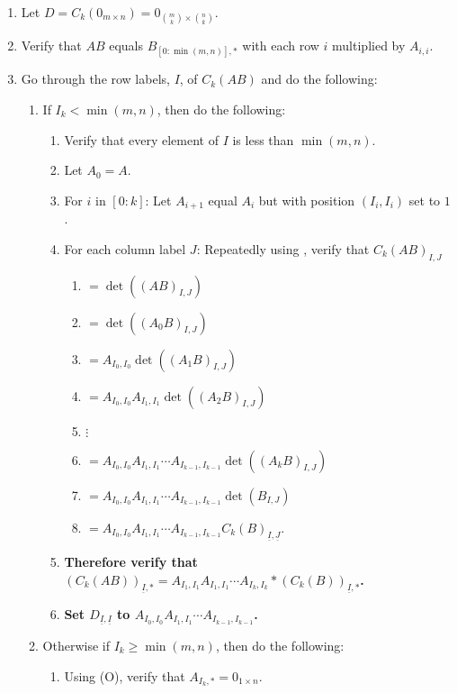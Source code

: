 \documentclass[twocolumn]{article}
\newcommand{\ul}[1]{\underline{#1}}
\newcommand{\procedurehr}[2][]{\hyperref[sec:procedure #2]{\ifthenelse{\equal{#1}{}}{procedure #2}{#1}}}
\begin{document}
				\begin{enumerate}
					\item Let $D=C_k(0_{m\times n})=0_{\binom{m}{k}\times\binom{n}{k}}$.
					\item Verify that $AB$ equals $B_{[0:\min(m,n)],*}$ with each row $i$ multiplied by $A_{i,i}$.
					\item Go through the row labels, $I$, of $C_k(AB)$ and do the following:
					\begin{enumerate}
						\item If $I_k<\min(m,n)$, then do the following:
						\begin{enumerate}
							\item Verify that every element of $I$ is less than $\min(m,n)$.
							\item Let $A_0=A$.
							\item For $i$ in $[0:k]$: Let $A_{i+1}$ equal $A_{i}$ but with position $(I_i,I_i)$ set to $1$.
							\item For each column label $J$: Repeatedly using \procedurehr{3.14}, verify that ${C_k(AB)}_{I,J}$
							\begin{enumerate}
								\item $=\det((AB)_{I,J})$
								\item $=\det((A_0B)_{I,J})$
								\item $=A_{I_0,I_0}\det((A_1B)_{I,J})$
								\item $=A_{I_0,I_0}A_{I_1,I_1}\det((A_2B)_{I,J})$
								\item $\vdots$
								\item $=A_{I_0,I_0}A_{I_1,I_1}\cdots A_{I_{k-1},I_{k-1}}\det((A_kB)_{I,J})$
								\item $=A_{I_0,I_0}A_{I_1,I_1}\cdots A_{I_{k-1},I_{k-1}}\det(B_{I,J})$
								\item $=A_{I_0,I_0}A_{I_1,I_1}\cdots A_{I_{k-1},I_{k-1}}{C_k(B)}_{\ul{I},\ul{J}}$.
							\end{enumerate}
							\item \textbf{Therefore verify that $(C_k(AB))_{\ul{I},*}=A_{I_1,I_1}A_{I_1,I_1}\cdots A_{I_k,I_k}*(C_k(B))_{\ul{I},*}$.}
							\item \textbf{Set $D_{\ul{I},\ul{I}}$ to $A_{I_0,I_0}A_{I_1,I_1}\cdots A_{I_{k-1},I_{k-1}}$.}
						\end{enumerate}
						\item Otherwise if $I_k\ge\min(m,n)$, then do the following:
						\begin{enumerate}
							\item Using (O), verify that $A_{I_k,*}=0_{1\times n}$.

\end{enumerate}
\end{enumerate}
\end{enumerate}
\end{document}
